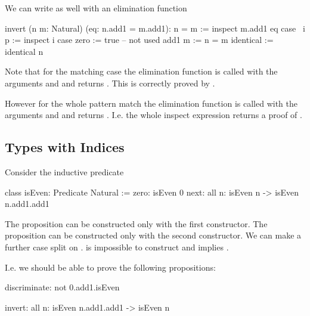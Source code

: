 We can write  as well with an elimination function

\begin{alba}
    invert (n m: Natural) (eq: n.add1 = m.add1): n = m :=
        inspect
            m.add1
            eq
        case
            {\ i p :=
                inspect i case
                    zero :=
                        true -- not used
                    add1 m :=
                        n = m}
            identical :=
                identical n
\end{alba}

Note that for the matching case the elimination function is called with the
arguments  and  and returns .  This is
correctly proved by .

However for the whole pattern match the elimination function is called with the
arguments  and  and returns . I.e. the
whole inspect expression returns a proof of .







\subsection{Types with Indices}

Consider the inductive predicate

\begin{alba}
    class
        isEven: Predicate Natural
    :=
        zero: isEven 0
        next: all n: isEven n -> isEven n.add1.add1
\end{alba}

The proposition  can be constructed only with the first
constructor. The proposition  can be
constructed only with the second constructor. We can make a further case split
on .   is impossible to construct and
 implies .

I.e. we should be able to prove the following propositions:

\begin{alba}
    discriminate: not 0.add1.isEven

    invert: all n: isEven n.add1.add1 -> isEven n
\end{alba}


